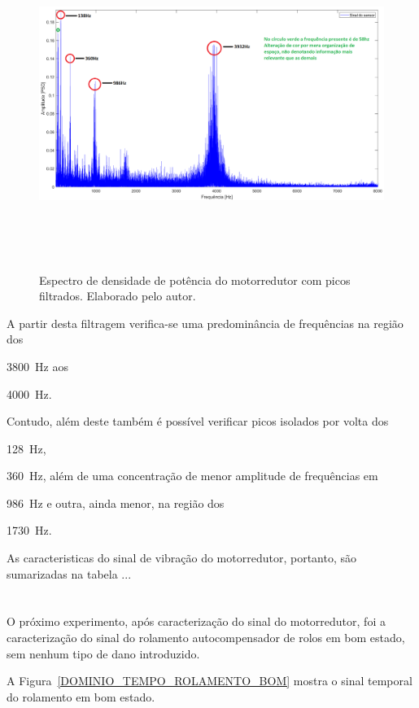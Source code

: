 \documentclass[
	12pt,				
	oneside,			
	a4paper,			
	english,			
	brazil,			
	]{abntex2ppgsi}
\begin{document}
{{{{{{{\begin{figure}[H]
\centering
\caption {Espectro de densidade de potência do motorredutor com picos filtrados. Elaborado pelo autor.}
\includegraphics[width=\textwidth,height=100mm,keepaspectratio]{GraficosAnalise/PSD_MOTORREDUTOR_FILTRADO_ANOTADO}
\label{PSD_MOTORREDUTOR_FILTRADO_ANOTADO}
\end{figure}

A partir desta filtragem verifica-se uma predominância de frequências na região dos {\SI{3800}{\hertz} aos {\SI{4000}{\hertz}. 

Contudo, além deste também é possível verificar picos isolados por volta dos {\SI{128}{\hertz}, {\SI{360}{\hertz}, além de uma concentração de menor amplitude de frequências em {\SI{986}{\hertz} e outra, ainda menor, na região dos {\SI{1730}{\hertz}. 

As caracteristicas do sinal de vibração do motorredutor, portanto, são sumarizadas na tabela ... 

\section{}

O próximo experimento, após caracterização do sinal do motorredutor, foi a caracterização do sinal do rolamento autocompensador de rolos em bom estado, sem nenhum tipo de dano introduzido. 

A Figura~\ref{DOMINIO_TEMPO_ROLAMENTO_BOM} mostra o sinal temporal do rolamento em bom estado. 

}}}}}}}}}}}}}
\end{document}
